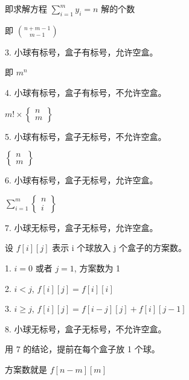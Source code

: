 \documentclass[a4paper]{article}
\begin{document}
   即求解方程 $\sum\limits_{i=1}^my_i=n$ 解的个数

   即 $\binom{n+m-1}{m-1}$

3. 小球有标号，盒子有标号，允许空盒。

   即 $m^n$

4. 小球有标号，盒子有标号，不允许空盒。

   $m!\times \begin{Bmatrix}n\\ m\end{Bmatrix}$

5. 小球有标号，盒子无标号，不允许空盒。

   $\begin{Bmatrix}n\\ m\end{Bmatrix}$

6. 小球有标号，盒子无标号，允许空盒。

   $\sum\limits_{i=1}^m\begin{Bmatrix}n\\ i\end{Bmatrix}$

7. 小球无标号，盒子无标号，允许空盒。

   设 $f[i][j]$ 表示 i 个球放入 j 个盒子的方案数。

   1. $i = 0$ 或者 $j = 1$, 方案数为 1

   2. $i < j$, $f[i][j]=f[i][i]$

   3. $i\ge j$, $f[i][j]=f[i-j][j]+f[i][j-1]$

8. 小球无标号，盒子无标号，不允许空盒。

   用 7 的结论，提前在每个盒子放 1 个球。

   方案数就是 $f[n-m][m]$
\end{document}
